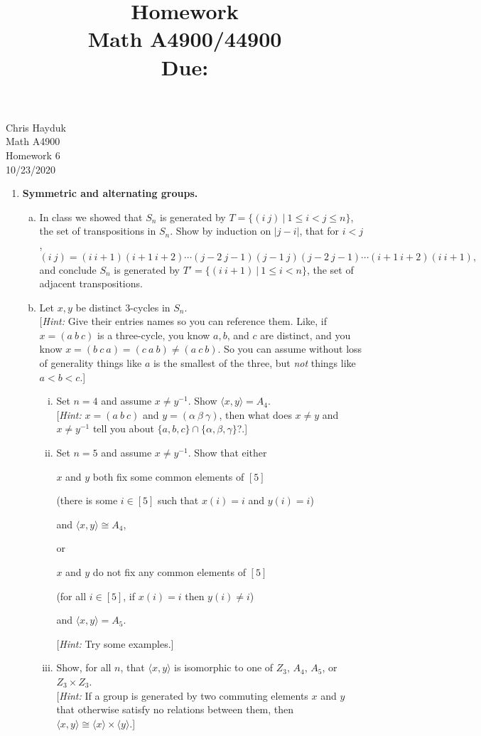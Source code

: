 \documentclass[11pt, reqno]{amsart}
\title[Homework \HW]{Homework \HW \\
Math A4900/44900\\
\small Due: \DUE}
\author{}
\theoremstyle{plain}
\theoremstyle{definition}
\theoremstyle{example}
\def\<{\langle} \def\>{\rangle}
\def\HW{6}
\def\DUE{10/23/2020}
\begin{document}
\begin{flushright}
Chris Hayduk\\
Math A4900\\
Homework \HW\\
\DUE
\end{flushright}





\begin{enumerate}[1.]
\item  {\bf Symmetric and alternating groups.}
\begin{enumerate}[(a)]
\item In class we showed that $S_n$ is generated by $T = \{(i\ j) ~|~ 1 \leq i < j \leq n \}$, the set of transpositions in $S_n$. Show by induction on $|j-i|$, that for $i<j$, 
$$(i\ j) = (i\ i+1) (i+1 \ i+2) \cdots (j-2\ j-1) (j-1 \ j) (j-2\ j-1) \cdots   (i+1 \ i+2)  (i\ i+1),$$
and conclude $S_n$ is generated by $T' =  \{(i\ i+1) ~|~ 1 \leq i < n \}$, the set of adjacent transpositions.
\item Let $x, y$ be distinct 3-cycles in $S_n$. \\
{[\emph{Hint:} Give their entries names so you can reference them. Like, if $x = (a\  b\  c)$ is a three-cycle, you know $a, b$, and $c$ are distinct, and you know $x = (b\  c\ a) = (c\ a\  b) \ne (a\  c\  b)$. So you can assume without loss of generality things like $a$ is the smallest of the three, but \emph{not} things like $a < b < c$.]}
\begin{enumerate}[(i)]
\item Set $n=4$ and assume $x \neq y^{-1}$. Show $\<x, y\> = A_4$.\\
{[\emph{Hint:} $x = (a\  b\ c)$ and $y = (\alpha\ \beta\  \gamma)$, then what does $x \ne y$ and $x \ne y^{-1}$ tell you about $\{a, b, c\} \cap \{\alpha, \beta, \gamma\}$?.]}
\item Set $n=5$ and assume $x \neq y^{-1}$. Show that either\\
\centerline{
	$x$ and $y$ both fix some common elements of $[5]$}
	\centerline{(there is some $i \in [5]$ such that $x(i) =i$ and $y(i) = i$)}
\centerline{
	and $\<x,y\> \cong A_4$,}
	or\\
\centerline{
	$x$ and $y$ do not fix any common elements of $[5]$}
	\centerline{(for all $i \in [5]$, if  $x(i) =i$ then $y(i) \neq i$)}
\centerline{
	and $\<x,y\> = A_5$.}
{[\emph{Hint:} Try some examples.]}
\item Show, for all $n$, that $\<x,y\>$ is isomorphic to one of $Z_3$, $A_4$, $A_5$, or $Z_3 \times Z_3$. \\
{[\emph{Hint:} If a group is generated by two commuting elements $x$ and $y$ that otherwise satisfy no relations between them, then $\<x,y\> \cong \<x\>\times\<y\>$.]}
\end{enumerate}
\end{enumerate}



\end{enumerate}
\end{document}

